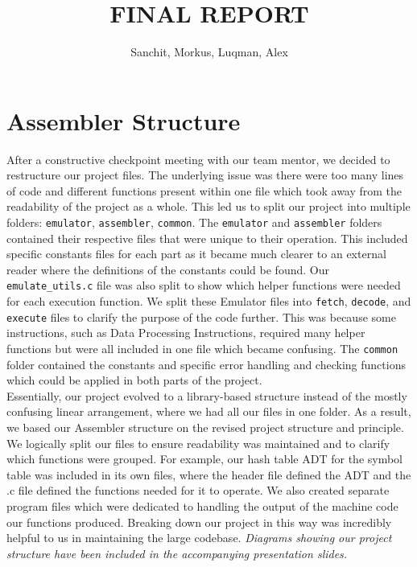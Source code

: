\documentclass[10pt]{article}
\begin{document}
\title{\vspace{-1cm}\textbf{FINAL REPORT}}

\date{}

\author{Sanchit, Morkus, Luqman,  Alex}

\maketitle

\section*{Assembler Structure}

After a constructive checkpoint meeting with our team mentor, we decided to restructure our project files. The underlying issue was there were too many lines of code and different functions present within one file which took away from the readability of the project as a whole. This led us to split our project into multiple folders: {\tt emulator}, {\tt assembler}, {\tt common}. The {\tt emulator} and {\tt assembler} folders contained their respective files that were unique to their operation. This included specific constants files for each part as it became much clearer to an external reader where the definitions of the constants could be found. Our {\tt emulate\_utils.c} file was also split to show which helper functions were needed for each execution function. We split these Emulator files into {\tt fetch}, {\tt decode}, and {\tt execute} files to clarify the purpose of the code further. This was because some instructions, such as Data Processing Instructions, required many helper functions but were all included in one file which became confusing.  The {\tt common} folder contained the constants and specific error handling and checking functions which could be applied in both parts of the project.
\\

Essentially, our project evolved to a library-based structure instead of the mostly confusing linear arrangement, where we had all our files in one folder. As a result, we based our Assembler structure on the revised project structure and principle. We logically split our files to ensure readability was maintained and to clarify which functions were grouped. For example, our hash table ADT for the symbol table was included in its own files, where the header file defined the ADT and the .c file defined the functions needed for it to operate. We also created separate program files which were dedicated to handling the output of the machine code our functions produced. Breaking down our project in this way was incredibly helpful to us in maintaining the large codebase. {\sl Diagrams showing our project structure have been included in the accompanying presentation slides.}
\end{document}
